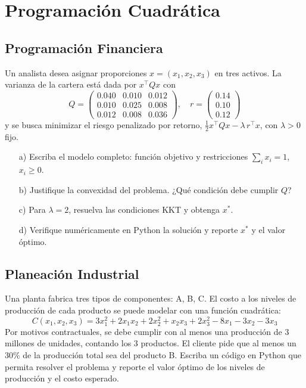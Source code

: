 \documentclass[12pt]{article}
\begin{document}
\section*{Programación Cuadrática}

\subsection{Programación Financiera}

Un analista desea asignar proporciones $x = (x_1, x_2, x_3)$ en tres activos. La varianza de la cartera está dada por $x^\top Q x$ con
\[
Q = \begin{pmatrix}
0.040 & 0.010 & 0.012 \\
0.010 & 0.025 & 0.008 \\
0.012 & 0.008 & 0.036
\end{pmatrix},\quad r = \begin{pmatrix}0.14 \\ 0.10 \\ 0.12\end{pmatrix}
\]
y se busca minimizar el riesgo penalizado por retorno, $\tfrac{1}{2} x^\top Q x - \lambda\, r^\top x$, con $\lambda>0$ fijo.
\begin{itemize}
    \item[a)] Escriba el modelo completo: función objetivo y restricciones $\sum_i x_i = 1$, $x_i \ge 0$.
    \item[b)] Justifique la convexidad del problema. ¿Qué condición debe cumplir $Q$?
    \item[c)] Para $\lambda = 2$, resuelva las condiciones KKT y obtenga $x^*$.
    \item[d)] Verifique numéricamente en Python la solución y reporte $x^*$ y el valor óptimo.
\end{itemize}

\subsection{Planeación Industrial}

Una planta fabrica tres tipos de componentes: A, B, C. El costo a los niveles de producción de cada producto se puede modelar con una función cuadrática:
\begin{equation*}
    C(x_1, x_2, x_3) = 3x_1^2 + 2x_1 x_2 + 2x_2^2+x_2 x_3 + 2x_3^2 - 8x_1 - 3x_2 - 3x_3
\end{equation*}
Por motivos contractuales, se debe cumplir con al menos una producción de 3 millones de unidades, contando los 3 productos. El cliente pide que al menos un 30\% de la producción total sea del producto B. Escriba un código en Python que permita resolver el problema y reporte el valor óptimo de los niveles de producción y el costo esperado.
\end{document}
